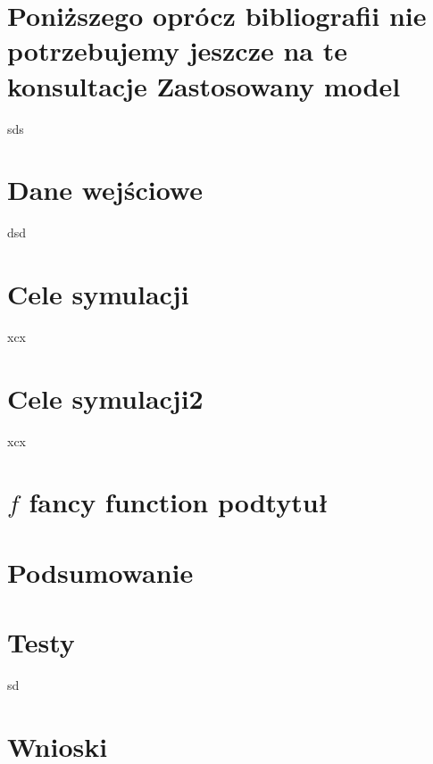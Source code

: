 \documentclass[a4paper, 11pt]{article}
\begin{document}
	
	\section{Poniższego oprócz bibliografii nie potrzebujemy jeszcze na te konsultacje  Zastosowany model}
	\indent

		
sds
	\section*{Dane wejściowe}
	\indent
	
	dsd
	\section*{Cele symulacji}
	\indent
	
xcx
	\section*{Cele symulacji2}
	\indent
	
	xcx
	\section*{$ f $ fancy function podtytuł}
	\indent
	\begin{figure}[H]%
	\end{figure}
	\section*{Podsumowanie}
	\indent
	

	\begin{figure}[bt]
	\end{figure}
	\section{Testy}
	\indent
	sd
	\section{Wnioski}
	\indent
	
\end{document}
